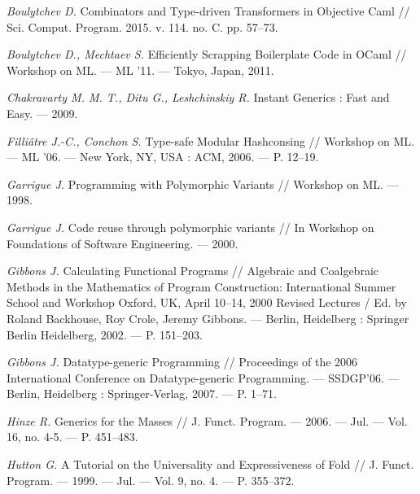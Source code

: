 \begin{thebibliography}{99}

\small


{\em Boulytchev D.} Combinators and Type-driven Transformers in
Objective Caml // Sci. Comput. Program. 2015.  v. 114. no. C. pp. 57–73.


{\em Boulytchev D., Mechtaev S.} Efficiently Scrapping Boilerplate
Code in OCaml // Workshop on ML. — ML ’11. — Tokyo, Japan, 2011.

{\em Chakravarty M. M. T., Ditu G., Leshchinskiy R.} In\-stant Generics : Fast and Easy. — 2009.

{\em Filli\^atre J.-C., Conchon S.} Type-safe Modular Hashconsing // Workshop on ML. — ML ’06. — New York, NY, USA : ACM, 2006. — P. 12–19.

{\em  Garrigue J.} Programming with Polymorphic Variants // Workshop on ML. — 1998.

{\em Garrigue J.} Code reuse through polymorphic variants // In
Workshop on Foundations of Software Engineering. — 2000.

{\em  Gibbons J.} Calculating Functional Programs // Algebraic and
Coalgebraic Methods in the Mathematics of Program Construction:
International Summer School and Workshop Oxford, UK, April 10–14, 2000 Revised Lectures / Ed. by Roland Backhouse, Roy Crole,
Jeremy Gibbons. — Berlin, Heidelberg : Springer Berlin Heidelberg,
2002. — P. 151–203. %

{\em Gibbons J.} Datatype-generic Programming // Proceedings
of the 2006 International Conference on Datatype-generic Program\-ming. — SSDGP’06. — Berlin, Heidelberg : Springer-Verlag, 2007. —
P. 1–71.%

{\em Hinze R.} Generics for the Masses // J. Funct. Program. — 2006. —
Jul. — Vol. 16, no. 4-5. — P. 451–483.

{\em Hutton G.} A Tutorial on the Universality and Expressive\-ness of Fold // J. Funct. Program. — 1999. — Jul. — Vol. 9,
no. 4. — P. 355–372. %


\end{thebibliography}
